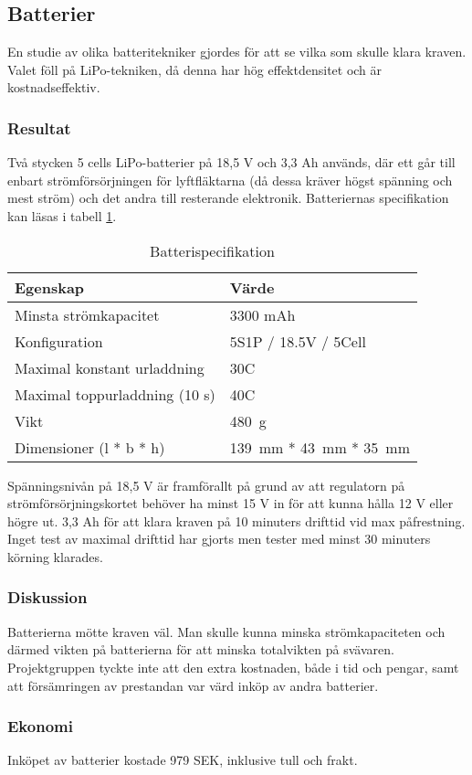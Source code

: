 \subsection{Batterier}
En studie av olika batteritekniker gjordes för att se vilka som skulle klara
kraven. Valet föll på LiPo-tekniken, då denna har hög effektdensitet och är
kostnadseffektiv.

\subsubsection{Resultat}
Två stycken 5 cells LiPo-batterier på 18,5 V och 3,3 Ah används, där ett går
till enbart strömförsörjningen för lyftfläktarna (då dessa kräver högst spänning
och mest ström) och det andra till resterande elektronik. Batteriernas
specifikation kan läsas i tabell \ref{tbl:Battery}.

\begin{table}[htbp!]
\centering
\caption{Batterispecifikation}
\label{tbl:Battery}
\begin{tabular}{l|l}
Egenskap & Värde \\
\hline
Minsta strömkapacitet & 3300 mAh\\
Konfiguration & 5S1P / 18.5V / 5Cell\\
Maximal konstant urladdning & 30C\\
Maximal toppurladdning (10 s) & 40C\\
Vikt & 480~g\\
Dimensioner (l * b * h) & 139~mm * 43~mm * 35~mm\\
\end{tabular}
\end{table}

Spänningsnivån på 18,5 V är framförallt på grund av att regulatorn på
strömförsörjningskortet behöver ha minst 15 V in för att kunna hålla 12 V eller
högre ut. 3,3 Ah för att klara kraven på 10 minuters drifttid vid max
påfrestning. Inget test av maximal drifttid har gjorts men tester med minst 30
minuters körning klarades.

\subsubsection{Diskussion}
Batterierna mötte kraven väl. Man skulle kunna minska
strömkapaciteten och därmed vikten på batterierna för att minska totalvikten på
svävaren.
Projektgruppen tyckte inte att den extra kostnaden, både i tid och pengar, samt
att försämringen av prestandan var värd inköp av andra batterier.

\subsubsection{Ekonomi}
Inköpet av batterier kostade 979 SEK, inklusive tull och frakt.
